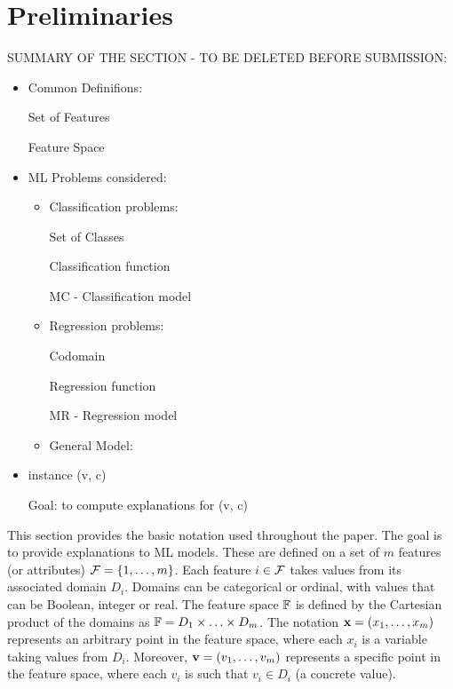 %
\section{Preliminaries} \label{sec:prelim}
%


SUMMARY OF THE SECTION - TO BE DELETED BEFORE SUBMISSION:
\begin{itemize}
\item Common Definifions:

Set of Features

Feature Space

\item ML Problems considered:
\begin{itemize}
\item Classification problems:

Set of Classes

Classification function

MC -  Classification model

\item Regression problems:

Codomain

Regression function

MR - Regression model

\item General Model:
\end{itemize}

\item instance (v, c)

Goal: to compute explanations for (v, c)

\end{itemize}



This section provides the basic notation used throughout the paper.
%
The goal is to provide explanations to ML models.
%
These are defined on a set of $m$ features (or attributes) ${\mathcal{F}}=\{1,\ldots,m\}$.
%
Each feature $i\in {\mathcal{F}}$ takes values from its associated domain $D_i$.
%
Domains can be categorical or ordinal, with values that can be Boolean, integer or real.
%
The feature space $\mathbb{F}$ is defined by the Cartesian product of the domains as $\mathbb{F}=D_1\times\ldots\times D_m$.
%
The notation $\mathbf{x}=(x_1,\ldots,x_m)$ represents an arbitrary point in the feature space, where each $x_i$ is a variable taking values from $D_i$.
%
Moreover, $\mathbf{v}=(v_1,\ldots,v_m)$ represents a specific point in the feature space, where each $v_i$ is such that $v_i \in D_i$ (a concrete value).

